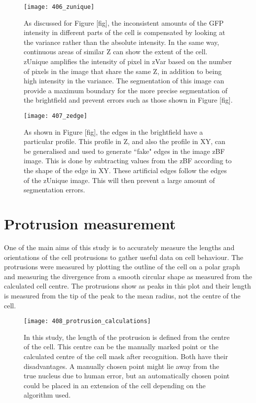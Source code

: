 \begin{figure}[h!]
 \centering
 \texttt{[image: 406\_zunique]}
 \caption[zUnique example]{
 	As discussed for Figure [fig], the inconsistent amounts of the GFP intensity in different parts of the cell is compensated by looking at the variance rather than the absolute intensity. In the same way, continuous areas of similar Z can show the extent of the cell. zUnique amplifies the intensity of pixel in zVar based on the number of pixels in the image that share the same Z, in addition to being high intensity in the variance. The segmentation of this image can provide a maximum boundary for the more precise segmentation of the brightfield and prevent errors such as those shown in Figure [fig].
 }
 \label{fig:zunique}
\end{figure}

\begin{figure}[h!]
 \centering
 \texttt{[image: 407\_zedge]}
 \caption[zEdge example]{
 	As shown in Figure [fig], the edges in the brightfield have a particular profile. This profile in Z, and also the profile in XY, can be generalised and used to generate ``fake" edges in the image zBF image. This is done by subtracting values from the zBF according to the shape of the edge in XY. These artificial edges follow the edges of the zUnique image. This will then prevent a large amount of segmentation errors.
 }
 \label{fig:zedge}
\end{figure}

\section{Protrusion measurement}

One of the main aims of this study is to accurately measure the lengths and orientations of the cell protrusions to gather useful data on cell behaviour. The protrusions were measured by plotting the outline of the cell on a polar graph and measuring the divergence from a smooth circular shape as measured from the calculated cell centre. The protrusions show as peaks in this plot and their length is measured from the tip of the peak to the mean radius, not the centre of the cell.

\begin{figure}[h!]
 \centering
 \texttt{[image: 408\_protrusion\_calculations]}
 \caption[Protrusion calulation]{
 	In this study, the length of the protrusion is defined from the centre of the cell. This centre can be the manually marked point or the calculated centre of the cell mask after recognition. Both have their disadvantages. A manually chosen point might lie away from the true nucleus due to human error, but an automatically chosen point could be placed in an extension of the cell depending on the algorithm used.
 }
 \label{fig:protrusioncalc}
\end{figure}

